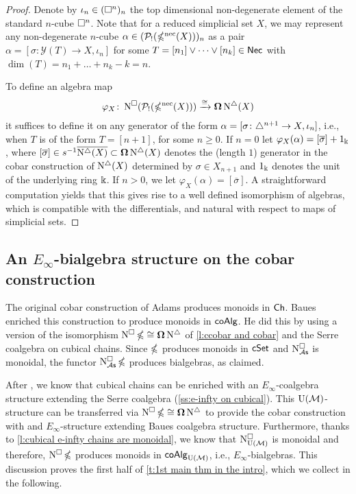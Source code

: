 \begin{proof}
	Denote by $\iota_n \in (\square^n)_n$ the top dimensional non-degenerate element of the standard $n$-cube $\square^n$.
	Note that for a reduced simplicial set $X$, we may represent any non-degenerate $n$-cube $\alpha \in (\mathcal{P}_!(\operatorname{\mathbb{\Omega}^{\mathrm{nec}}}(X)))_n$ as a pair $\alpha = [\sigma \colon \mathcal{Y}(T) \to X, \iota_n]$ for some $T = [n_1] \vee \dots \vee [n_k] \in \mathsf{Nec}$ with $\dim(T) = n_1 + \dots + n_k - k = n$.

	To define an algebra map
	\[
	\varphi_X \colon \operatorname{N^{\square}}(\mathcal{P}_!(\operatorname{\mathbb{\Omega}^{\mathrm{nec}}}(X))) \xrightarrow{\cong} \operatorname{\mathbf{\Omega}} \operatorname{N^{\triangle}}(X)
	\]
	it suffices to define it on any generator of the form $\alpha=[\sigma \colon \triangle^{n+1} \to X, \iota_{n}]$, i.e., when $T$ is of the form $T = [n+1]$, for some $n \geq 0$.
	If $n = 0$ let $\varphi_X(\alpha)= [\overline{\sigma}] + 1_\Bbbk$, where $[\overline{\sigma}] \in s^{-1} \overline{ \operatorname{N^{\triangle}}(X)} \subset \operatorname{\mathbf{\Omega}} \operatorname{N^{\triangle}}(X)$ denotes the (length $1$) generator in the cobar construction of $\operatorname{N^{\triangle}}(X)$ determined by $\sigma \in X_{n+1}$ and $1_\Bbbk$ denotes the unit of the underlying ring $\Bbbk$.
	If $n > 0$, we let $\varphi_X(\alpha)=[\overline{\sigma}]$.
	A straightforward computation yields that this gives rise to a well defined isomorphism of algebras, which is compatible with the differentials, and natural with respect to maps of simplicial sets.
\end{proof}

\subsection{An $E_{\infty}$-bialgebra structure on the cobar construction} \label{ss:e-infty on cobar}

The original cobar construction of Adams produces monoids in $\mathsf{Ch}$.
Baues enriched this construction to produce monoids in $\mathsf{coAlg}$.
He did this by using a version of the isomorphism $\operatorname{N^{\square}} \operatorname{\mathbb{\Omega}} \cong \operatorname{\mathbf{\Omega}} \operatorname{N^{\triangle}}$ of \cref{l:ccobar and cobar} and the Serre coalgebra on cubical chains.
Since $\operatorname{\mathbb{\Omega}}$ produces monoids in $\mathsf{cSet}$ and $\operatorname{N^{\square}_{{\mathcal{A}\mathsf{s}}}}$ is monoidal, the functor $\operatorname{N^{\square}_{{\mathcal{A}\mathsf{s}}}} \operatorname{\mathbb{\Omega}}$ produces bialgebras, as claimed.

After \cite{medina2021cubical}, we know that cubical chains can be enriched with an $E_\infty$-coalgebra structure extending the Serre coalgebra (\cref{ss:e-infty on cubical}).
This ${\operatorname{U}(\mathcal{M})}$-structure can be transferred via $\operatorname{N^{\square}} \operatorname{\mathbb{\Omega}} \cong \operatorname{\mathbf{\Omega}} \operatorname{N^{\triangle}}$ to provide the cobar construction with and $E_\infty$-structure extending Baues coalgebra structure.
Furthermore, thanks to \cref{l:cubical e-infty chains are monoidal}, we know that $\operatorname{N^{\square}_{{\operatorname{U}(\mathcal{M})}}}$ is monoidal and therefore, $\operatorname{N^{\square}} \operatorname{\mathbb{\Omega}}$ produces monoids in $\mathsf{coAlg}_{{\operatorname{U}(\mathcal{M})}}$, i.e., $E_\infty$-bialgebras.
This discussion proves the first half of \cref{t:1st main thm in the intro}, which we collect in the following.

